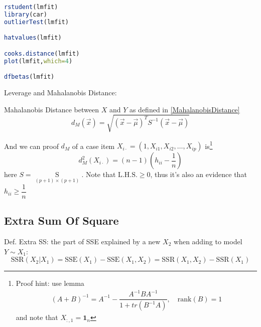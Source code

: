     
 


\begin{rcode}
\begin{lstlisting}[language=R]
rstudent(lmfit)
library(car)
outlierTest(lmfit)

hatvalues(lmfit)

cooks.distance(lmfit)
plot(lmfit,which=4)

dfbetas(lmfit)
\end{lstlisting}
\end{rcode}

















Leverage and Mahalanobis Distance:
    
Mahalanobis Distance between $ X $ and $ Y $ as defined in \autoref{MahalanobisDistance}
\begin{equation}
     d_M(\vec{x})=\sqrt{(\vec{x}-\vec{\mu})^TS ^{-1}(\vec{x}-\vec{\mu})} 
\end{equation}

And we can proof $ d_M $ of a case item $ X_{ i\cdot}=(1,X_{i1},X_{i2},\ldots,X_{ip}) $ is\footnote{Proof hint: use lemma 
\begin{align}
    (A+B)^{-1}=A^{-1}-\dfrac{A^{-1}BA^{-1}}{1+tr(B^{-1}A)},\quad \mathrm{rank}(B)=1 
\end{align}
and note that $ X_{:,1}=\mathbf{1}_n $
}
\begin{equation}
    d_{M}^2(X_{i\cdot})=(n-1)(h_{ii}-\dfrac{1}{n}) 
\end{equation}
here $ S=\mathop{S}\limits_{(p+1)\times (p+1)}  $. Note that $  \mathrm{L.H.S.}\geq 0$, thus it's also an evidence that $ h_{ii}\geq \dfrac{1}{n} $

\subsection{Extra Sum Of Square}\label{SubSubSectionExtraSumOfSquare}
    Def. Extra SS: the part of SSE explained by a new $ X_2 $ when adding to model $ Y\sim X_1 $:
    \begin{equation}
        \mathrm{SSR}(X_2|X_1)=\mathrm{SSE}(X_1)-\mathrm{SSE}(X_1,X_2)=\mathrm{SSR}(X_1,X_2)-\mathrm{SSR}(X_1)  
    \end{equation}

